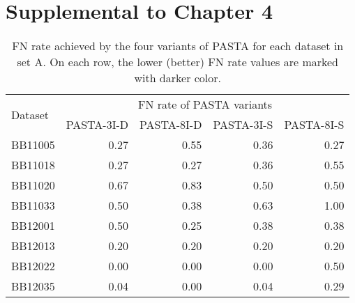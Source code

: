 \section{Supplemental to Chapter 4}
\label{sec:result_balibase}

\begin{table}[htbp]
	\centering
	\small
	\caption{FN rate achieved by the four variants of PASTA for each dataset in set A. On each row, the lower (better) FN rate values are marked with darker color.}
	\begin{tabular}{|l|r|r|r|r|}
		\hline
		\multirow{2}{*}{Dataset} & \multicolumn{4}{c|}{FN rate of PASTA variants } \\
		\cline{2-5}          & \multicolumn{1}{l|}{PASTA-3I-D} & \multicolumn{1}{l|}{PASTA-8I-D} & \multicolumn{1}{l|}{PASTA-3I-S} & \multicolumn{1}{l|}{PASTA-8I-S} \\
		\hline
		BB11005 & \cellcolor[rgb]{ .384,  .745,  .478}0.27 & \cellcolor[rgb]{ .988,  1,  .992}0.55 & \cellcolor[rgb]{ .584,  .827,  .647}0.36 & \cellcolor[rgb]{ .384,  .745,  .478}0.27 \\
		\hline
		BB11018 & \cellcolor[rgb]{ .384,  .745,  .478}0.27 & \cellcolor[rgb]{ .384,  .745,  .478}0.27 & \cellcolor[rgb]{ .584,  .827,  .647}0.36 & \cellcolor[rgb]{ .988,  1,  .992}0.55 \\
		\hline
		BB11020 & \cellcolor[rgb]{ .686,  .871,  .733}0.67 & \cellcolor[rgb]{ .988,  1,  .992}0.83 & \cellcolor[rgb]{ .384,  .745,  .478}0.50 & \cellcolor[rgb]{ .384,  .745,  .478}0.50 \\
		\hline
		BB11033 & \cellcolor[rgb]{ .502,  .796,  .58}0.50 & \cellcolor[rgb]{ .384,  .745,  .478}0.38 & \cellcolor[rgb]{ .624,  .847,  .682}0.63 & \cellcolor[rgb]{ .988,  1,  .992}1.00 \\
		\hline
		BB12001 & \cellcolor[rgb]{ .988,  1,  .992}0.50 & \cellcolor[rgb]{ .384,  .745,  .478}0.25 & \cellcolor[rgb]{ .686,  .871,  .733}0.38 & \cellcolor[rgb]{ .686,  .871,  .733}0.38 \\
		\hline
		BB12013 & \cellcolor[rgb]{ .988,  1,  .992}0.20 & \cellcolor[rgb]{ .988,  1,  .992}0.20 & \cellcolor[rgb]{ .988,  1,  .992}0.20 & \cellcolor[rgb]{ .988,  1,  .992}0.20 \\
		\hline
		BB12022 & \cellcolor[rgb]{ .384,  .745,  .478}0.00 & \cellcolor[rgb]{ .384,  .745,  .478}0.00 & \cellcolor[rgb]{ .384,  .745,  .478}0.00 & \cellcolor[rgb]{ .988,  1,  .992}0.50 \\
		\hline
		BB12035 & \cellcolor[rgb]{ .467,  .78,  .549}0.04 & \cellcolor[rgb]{ .384,  .745,  .478}0.00 & \cellcolor[rgb]{ .467,  .78,  .549}0.04 & \cellcolor[rgb]{ .988,  1,  .992}0.29 \\

\end{tabular}
\end{table}
